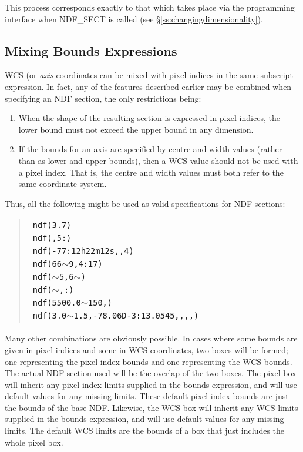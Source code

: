 \documentclass[twoside,11pt]{article}
\newcommand{\htmlref}[2]{#1}
\newcommand{\xlabel}[1]{}
\newcommand{\st}[1]{{\em{#1}}}
\newcommand{\hi}[1]{{\tt{#1}}}
\begin{document}
This process corresponds exactly to that which takes place via the
programming interface when \htmlref{NDF\_SECT}{NDF_SECT} is called (see
\S\ref{ss:changingdimensionality}).

\subsection{\xlabel{mixing_bounds_expressions}Mixing Bounds Expressions}

WCS (or \st{axis\/} coordinates can be mixed with pixel indices in the same 
subscript expression. In fact, any of
the features described earlier may be combined when specifying an NDF section,
the only restrictions being:

\begin{enumerate}
\item When the shape of the resulting section is
expressed in pixel indices, the lower bound must not exceed the upper bound in
any dimension. 
\item If the bounds for an axis are specified by centre and width values
(rather than as lower and upper bounds), then a WCS value should not be
used with a pixel index. That is, the centre and width values must both
refer to the same coordinate system.
\end{enumerate}

Thus, all the following might be used as valid specifications for
NDF sections:

\small
\begin{quote}
\begin{center}
\begin{tabular}{l}
\hi{ndf(3.7)}\\
\hi{ndf(,5:)}\\
\hi{ndf(-77:12h22m12s,,4)}\\
\hi{ndf(66}$\sim$\hi{9,4:17)}\\
\hi{ndf(}$\sim$\hi{5,6}$\sim$\hi{)}\\
\hi{ndf(}$\sim$\hi{,:)}\\
\hi{ndf(5500.0}$\sim$\hi{150,)}\\
\hi{ndf(3.0}$\sim$\hi{1.5,-78.06D-3:13.0545,,,,)}\\
\end{tabular}
\end{center}
\end{quote}
\normalsize

Many other combinations are obviously possible. In cases where some
bounds are given in pixel indices and some in WCS coordinates, two boxes
will be formed; one representing the pixel index bounds and one
representing the WCS bounds. The actual NDF section used will be the
overlap of the two boxes. The pixel box will inherit any pixel index
limits supplied in the bounds expression, and will use default values for
any missing limits. These default pixel index bounds are just the bounds
of the base NDF. Likewise, the WCS box will inherit any WCS limits
supplied in the bounds expression, and will use default values for any
missing limits. The default WCS limits are the bounds of a box that just
includes the whole pixel box.
\end{document}
